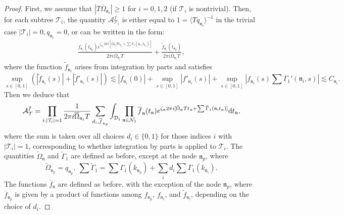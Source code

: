 \documentclass[UTF-8,reqno]{amsart}
\numberwithin{equation}{section}
\theoremstyle{definition}
\def\dif{{\mathord{{\rm d}}}}
\def\geq{\geqslant}
\def\dif{{\mathord{{\rm d}}}}
\def\geq{\geqslant}
\begin{document}
\begin{proof}
First, we assume that $|T\overline\Omega_{\mathfrak{n}_i}|\geq 1$ for $i=0,1,2$ (if $\mathcal{T}_i$ is nontrivial). Then, for each subtree $\mathcal{T}_i$, the quantity   $\mathcal{A}^f_{\mathcal{T}_i}$ is either equal to $1=\langle Tq_{\mathfrak{n}_i}\rangle^{-1}$ in the trivial case $|\mathcal{T}_i|=0,q_{\mathfrak{n}_i}=0$, or can be written in the form:
\begin{align*}
    \frac{f_{\mathfrak{n}_i}(t_{\mathfrak{n}_p})e^{ \zeta_{\mathfrak{n}_i}2\pi i[\overline\Omega_{\mathfrak{n}_i}Tt_{\mathfrak{n}_p}+\sum\Gamma_1(\mathfrak{n}_i,t_{\mathfrak{n}_p})] }}{2\pi i\overline\Omega_{\mathfrak{n}_i}T}+\frac{\tilde{f}_{\mathfrak{n}_i}(t_{\mathfrak{n}_p})}{2\pi i\overline\Omega_{\mathfrak{n}_i}T},
\end{align*}
where the function $\tilde{f}_{\mathfrak{n}_i}$ arises from integration by parts and satisfies $$\sup_{s\in[0,1]}(|\tilde{f}_{\mathfrak{n}_i}(s)|+|\tilde{f}'_{\mathfrak{n}_i}(s)|)\lesssim |f_{\mathfrak{n}_i}(0)| +\sup_{s\in[0,1]}|f'_{\mathfrak{n}_i}(s)| +\sup_{s\in[0,1]}|f_{\mathfrak{n}_i}(s)\sum\Gamma_1'({\mathfrak{n}_i},s)|\lesssim C_{\mathfrak{n}_i}.$$
Then we  deduce that \begin{align*}
       \mathcal{A}^f_{\mathcal{T}}=\prod_{i:|\mathcal{T}_i|=1}\frac{1}{2\pi i\overline\Omega_{\mathfrak{n}_i}T}\sum_{d_i,\overline  f_{\mathfrak{n}_p}}   \int_{\mathcal{D}_1}\prod_{\mathfrak{n}\in\mathcal{N}_1}  \overline f_{\mathfrak{n}}(t_{\mathfrak{n}})e^{\zeta_\mathfrak{n}2\pi i[\tilde\Omega_\mathfrak{n}Tt_\mathfrak{n}+\sum \tilde \Gamma_1(\mathfrak{n},t_\mathfrak{n})] } \dif t_\mathfrak{n},
   \end{align*}
where the sum is taken over all choices $d_i\in\{0,1\}$ for those indices $i$ with $|\mathcal{T}_i|= 1$, corresponding to whether integration by parts is applied to $\mathcal{T}_i$. The quantities $\tilde\Omega_{\mathfrak{n}}$ and $\tilde\Gamma_1$ are defined as before, except at the node $\mathfrak{n}_p$, where  $$\tilde \Omega_{\mathfrak{n}_p}=q_{\mathfrak{n}_p},\  \sum \tilde{\Gamma}_1=\sum \Gamma_1(k_{\mathfrak{n}_p})+\sum_{i}d_i\sum \Gamma_1(k_{\mathfrak{n}_i}).$$
   The functions $\overline f_{\mathfrak{n}}$ are defined as before, with the exception of the node $\mathfrak{n}_p$, where $\overline f_{\mathfrak{n}_p}$ is given by a product of functions among $f_{\mathfrak{n}_p}$, $f_{\mathfrak{n}_i}$, and $\tilde{f}_{\mathfrak{n}_i}$, depending on the choice of $d_i$.
 

\end{proof}
\end{document}
